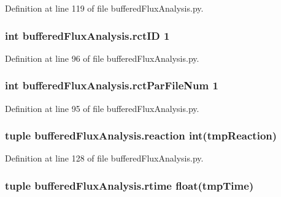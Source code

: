Definition at line 119 of file buffered\-Flux\-Analysis.\-py.

\hypertarget{namespacebuffered_flux_analysis_ac7b9057f347140dc5ffb27b86665b372}{
\subsubsection[{rct\-I\-D}]{\setlength{\rightskip}{0pt plus 5cm}int buffered\-Flux\-Analysis.\-rct\-I\-D 1}}\label{namespacebuffered_flux_analysis_ac7b9057f347140dc5ffb27b86665b372}


Definition at line 96 of file buffered\-Flux\-Analysis.\-py.

\hypertarget{namespacebuffered_flux_analysis_aa203d8968b82cc631fffe3da7c46ddfd}{
\subsubsection[{rct\-Par\-File\-Num}]{\setlength{\rightskip}{0pt plus 5cm}int buffered\-Flux\-Analysis.\-rct\-Par\-File\-Num 1}}\label{namespacebuffered_flux_analysis_aa203d8968b82cc631fffe3da7c46ddfd}


Definition at line 95 of file buffered\-Flux\-Analysis.\-py.

\hypertarget{namespacebuffered_flux_analysis_ae2f3c773b4d02cc6548fa0199cd93d81}{
\subsubsection[{reaction}]{\setlength{\rightskip}{0pt plus 5cm}tuple buffered\-Flux\-Analysis.\-reaction int(tmp\-Reaction)}}\label{namespacebuffered_flux_analysis_ae2f3c773b4d02cc6548fa0199cd93d81}


Definition at line 128 of file buffered\-Flux\-Analysis.\-py.

\hypertarget{namespacebuffered_flux_analysis_a3a242047ff630fce5bc0c36591a9b22b}{
\subsubsection[{rtime}]{\setlength{\rightskip}{0pt plus 5cm}tuple buffered\-Flux\-Analysis.\-rtime float(tmp\-Time)}}\label{namespacebuffered_flux_analysis_a3a242047ff630fce5bc0c36591a9b22b}


